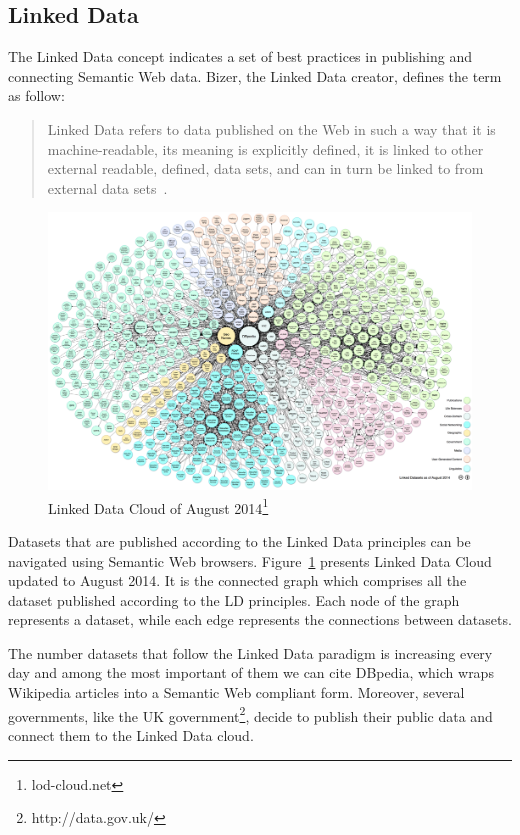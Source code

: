 \subsection{Linked Data}\label{sec:ldata}

The Linked Data concept indicates a set of best practices in publishing and connecting Semantic Web data. Bizer, the Linked Data creator, defines the term as follow:

\begin{quote}
Linked Data refers to data published on the Web in such a way that it is machine-readable, its meaning is explicitly defined, it is linked to other external readable, defined, data sets, and can in turn be linked to from external data sets~\cite{heath2011linked}.
\end{quote} 

\begin{figure}[tbh]
  \centering
	\includegraphics[width=\linewidth]{images/lod}
	\caption[Linked Data Cloud]{Linked Data Cloud of August 2014\footnote{lod-cloud.net}} 
  	\label{fig:lod}
\end{figure}

Datasets that are published according to the Linked Data principles can be navigated using Semantic Web browsers. Figure~\ref{fig:lod} presents  Linked Data Cloud updated to August 2014. It is the connected graph which comprises all the dataset published according to the LD principles. Each node of the graph represents a dataset, while each edge represents the connections between datasets.

The number datasets that follow the Linked Data paradigm is increasing every day and among the most important of them we can cite DBpedia, which wraps Wikipedia articles into a Semantic Web compliant form. Moreover, several governments, like the UK government\footnote{http://data.gov.uk/}, decide to publish their public data and connect them to the Linked Data cloud. 

